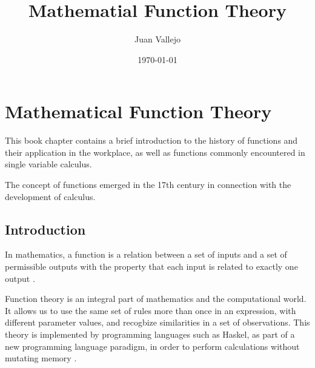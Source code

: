 \documentclass[11pt,oneside]{book}              %
\title{\bf Mathematial Function Theory}    %
\author{Juan Vallejo}              %
\date{\today}                           %
\begin{document}
\frontmatter                            %
\maketitle                              %
\tableofcontents                        %
\mainmatter                             %
\chapter{Mathematical Function Theory}                %
This book chapter contains a brief introduction to the history of functions and their application in the workplace, as well as functions commonly encountered in single variable calculus.
 
The concept of functions emerged in the 17th century in connection with the development of calculus.

\section{Introduction}                  %
In mathematics, a function is a relation between a set of inputs and a set of permissible outputs with the property that each input is related to exactly one output \cite{wolfram1}.

Function theory is an integral part of mathematics and the computational world. It allows us to use the same set of rules more than once in an expression, with different parameter values, and recogbize similarities in a set of observations. This theory is implemented by programming languages such as Haskel, as part of a new programming language paradigm, in order to perform calculations without mutating memory \cite{mathexchange2}.
\end{document}
